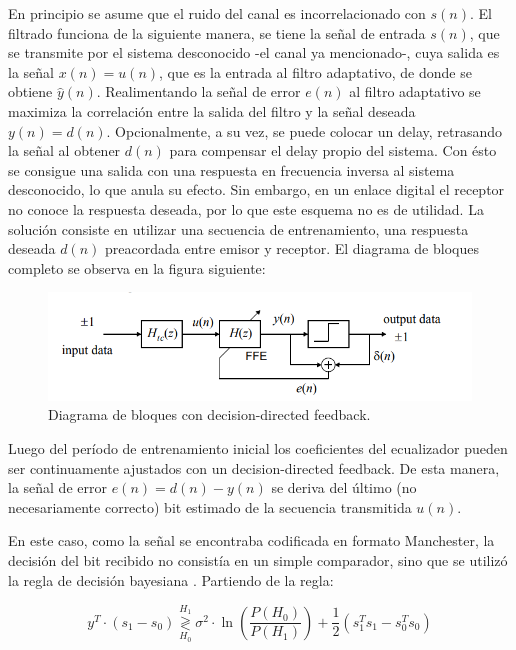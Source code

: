 \documentclass[main.tex]{subfiles}
\begin{document}
En principio se asume que el ruido del canal 
es incorrelacionado con $s(n)$.
El filtrado funciona de la siguiente manera, se tiene 
la señal de entrada $s(n)$, que se transmite por el sistema
desconocido -el canal ya mencionado-, cuya salida es la señal 
$x(n)=u(n)$, que es la entrada al filtro adaptativo, de donde se obtiene
$\hat{y}(n)$. Realimentando la señal de error $e(n)$
al filtro adaptativo se maximiza la correlación entre la salida del 
filtro y la señal deseada $y(n)=d(n)$.
Opcionalmente, a su vez, se puede colocar un delay, retrasando la señal al obtener 
$d(n)$ para compensar el delay propio del sistema.\newline
Con ésto se consigue una salida con una respuesta en frecuencia inversa
al sistema desconocido, lo que anula su efecto.\newline
Sin embargo, en un enlace digital el receptor no conoce la respuesta deseada, por lo que
este esquema no es de utilidad. La solución consiste en utilizar 
una secuencia de entrenamiento, una respuesta deseada $d(n)$ preacordada entre 
emisor y receptor.
El diagrama de bloques completo se observa en la figura siguiente:
\begin{figure}[h]
    \centering
    \includegraphics[scale=0.4]{imagenes/esquema.PNG}
    \caption{Diagrama de bloques con decision-directed feedback.}
\end{figure}
Luego del período de entrenamiento inicial los coeficientes del ecualizador pueden ser
 continuamente ajustados con un decision-directed feedback. De esta manera, 
 la señal de error $e(n)=d(n)-y(n)$ se deriva del último (no necesariamente correcto) 
 bit estimado de la secuencia transmitida $u(n)$. 
 
 En este caso, como la se\~nal se encontraba codificada en formato Manchester, la decisi\'on
 del bit recibido no consist\'ia en un simple comparador, sino que se utiliz\'o la regla de decisi\'on
 bayesiana \cite{shanmugan}. Partiendo de la regla:
 
 \begin{equation}
 	y^{T} \cdot (s_1 - s_0) \underset{H_0}{\overset{H_1}{\gtrless}} 
 	\sigma^2 \cdot \ln{\left( \frac{P(H_0)}{P(H_1)} \right)}
 	+ \frac{1}{2} \left( s_1^T s_1 - s_0^T s_0\right)
 \end{equation}
 
\end{document}

